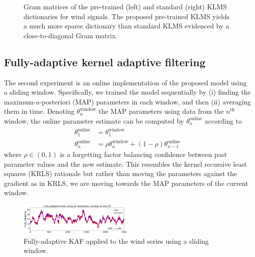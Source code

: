 \begin{figure}[t!]
	\centering
	\caption{Gram matrices of the pre-trained (left) and standard (right) KLMS dictionaries for wind signals. The proposed pre-trained KLMS yields a much more sparse dictionary than standard KLMS evidenced by a close-to-diagonal Gram matrix. }
	\label{wind-confmat}
\end{figure}


\subsection{Fully-adaptive kernel adaptive filtering}

The second experiment is an online implementation of the proposed model using a sliding window. Specifically, we trained the model sequentially by (i) finding the maximum-a-posteriori (MAP) parameters  in each window, and then (ii) averaging them in time. Denoting $\theta_n^{\text{window}}$ the MAP parameters using data from the $n^\text{th}$ window, the online parameter estimate can be computed by $\theta_{n}^{\text{online}}$ according to
\begin{align}
\theta^{\text{online}}_{1} &= \theta^{\text{window}}_{1}\\ 
\theta_{n}^{\text{online}} &= \rho\theta_n^{\text{window}} + (1-\rho)\theta_{n-1}^{\text{online}}
\end{align}
where $\rho\in(0,1)$ is a forgetting factor balancing confidence between past parameter values and the new estimate. This resembles the kernel recursive least squares (KRLS) \cite{engel04,van2012kernel} rationale but rather than moving the parameters against the gradient as in KRLS, we are moving towards the MAP parameters of the current window. 

\begin{figure}[t!]
	\centering
	\includegraphics[width=0.5\textwidth]{img/fully_adaptive_estimate3}
	\caption{Fully-adaptive KAF applied to the wind series using a sliding window.}
	\label{fig:adaptive-wind}
\end{figure}

